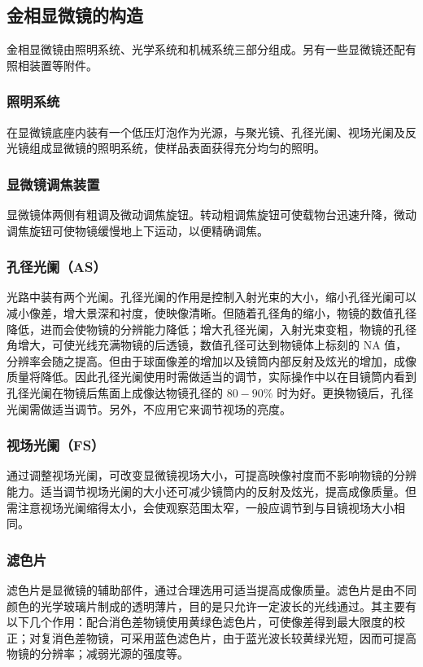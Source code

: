     \subsection{金相显微镜的构造}
        金相显微镜由照明系统、光学系统和机械系统三部分组成。另有一些显微镜还配有照相装置等附件。
        \subsubsection{照明系统}
            在显微镜底座内装有一个低压灯泡作为光源，与聚光镜、孔径光阑、视场光阑及反光镜组成显微镜的照明系统，使样品表面获得充分均匀的照明。
        \subsubsection{显微镜调焦装置}
            显微镜体两侧有粗调及微动调焦旋钮。转动粗调焦旋钮可使载物台迅速升降，微动调焦旋钮可使物镜缓慢地上下运动，以便精确调焦。
        \subsubsection{孔径光阑（AS）}
            光路中装有两个光阑。孔径光阑的作用是控制入射光束的大小，缩小孔径光阑可以减小像差，增大景深和衬度，使映像清晰。但随着孔径角的缩小，物镜的数值孔径降低，进而会使物镜的分辨能力降低；增大孔径光阑，入射光束变粗，物镜的孔径角增大，可使光线充满物镜的后透镜，数值孔径可达到物镜体上标刻的 NA 值，分辨率会随之提高。但由于球面像差的增加以及镜筒内部反射及炫光的增加，成像质量将降低。因此孔径光阑使用时需做适当的调节，实际操作中以在目镜筒内看到孔径光阑在物镜后焦面上成像达物镜孔径的 $80-90\%$ 时为好。更换物镜后，孔径光阑需做适当调节。另外，不应用它来调节视场的亮度。
        \subsubsection{视场光阑（FS）}
            通过调整视场光阑，可改变显微镜视场大小，可提高映像衬度而不影响物镜的分辨能力。适当调节视场光阑的大小还可减少镜筒内的反射及炫光，提高成像质量。但需注意视场光阑缩得太小，会使观察范围太窄，一般应调节到与目镜视场大小相同。
        \subsubsection{滤色片}
            滤色片是显微镜的辅助部件，通过合理选用可适当提高成像质量。滤色片是由不同颜色的光学玻璃片制成的透明薄片，目的是只允许一定波长的光线通过。其主要有以下几个作用：配合消色差物镜使用黄绿色滤色片，可使像差得到最大限度的校正；对复消色差物镜，可采用蓝色滤色片，由于蓝光波长较黄绿光短，因而可提高物镜的分辨率；减弱光源的强度等。
